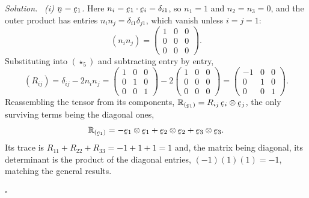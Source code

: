 \documentclass[17pt,a4paper]{extreport}
\DeclareRobustCommand{\vek}[1]{\underaccent{\tilde}{#1}}
\newcommand{\Refl}[1]{\mathbb{R}_{(#1)}}
\newcommand{\be}{\vek{e}}
\newcommand{\bn}{\vek{n}}
\newcommand{\dd}{\delta}
\newcommand{\ip}[2]{#1\cdot#2}
\theoremstyle{scplain}
\theoremstyle{scdefn}
\theoremstyle{scplain}
\newenvironment{solution}
 {\par\smallskip\noindent\textit{Solution.}\ }
 {\hfill$\square$\par\medskip}
\begin{document}
\begin{solution}
\emph{(i) $\bn=\be_1$.} Here $n_i=\ip{\be_1}{\be_i}=\dd_{i1}$, so
$n_1=1$ and $n_2=n_3=0$, and the outer product has entries
$n_in_j=\dd_{i1}\dd_{j1}$, which vanish unless $i=j=1$:
\[
   (n_in_j)=\begin{pmatrix}1&0&0\\0&0&0\\0&0&0\end{pmatrix}.
\]
Substituting into $(\star_5)$ and subtracting entry by entry,
\[
   (R_{ij})=\dd_{ij}-2n_in_j
   =\begin{pmatrix}1&0&0\\0&1&0\\0&0&1\end{pmatrix}
   -2\begin{pmatrix}1&0&0\\0&0&0\\0&0&0\end{pmatrix}
   =\begin{pmatrix}-1&0&0\\0&1&0\\0&0&1\end{pmatrix}.
\]
Reassembling the tensor from its components,
$\Refl{\be_1}=R_{ij}\,\be_i\otimes\be_j$, the only surviving terms being the
diagonal ones,
\[
   \Refl{\be_1}=-\be_1\otimes\be_1+\be_2\otimes\be_2+\be_3\otimes\be_3 .
\]
Its trace is $R_{11}+R_{22}+R_{33}=-1+1+1=1$ and, the matrix being
diagonal, its determinant is the product of the diagonal entries,
$(-1)(1)(1)=-1$, matching the general results.


\end{solution}
\end{document}
